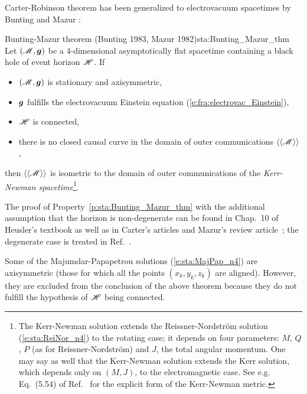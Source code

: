 Carter-Robinson theorem has been generalized to electrovacuum spacetimes
by Bunting \cite{Bunti83} and Mazur \cite{Mazur82}:

\begin{tprop}{Bunting-Mazur theorem
\textnormal{(Bunting 1983, Mazur 1982)}}{sta:Bunting_Mazur_thm}
Let $(\mathscr{M},\bm{g})$ be a 4-dimensional asymptotically flat spacetime
containing a black hole of event horizon $\mathscr{H}$. If
\begin{itemize}
\item $(\mathscr{M},\bm{g})$ is stationary and axisymmetric,
\item $\bm{g}$ fulfills the electrovacuum Einstein equation (\ref{e:fra:electrovac_Einstein}),
\item $\mathscr{H}$ is connected,
\item there is no closed causal curve in the domain of outer communications $\langle\langle \mathscr{M}\rangle\rangle$,
\end{itemize}
then $\langle\langle \mathscr{M}\rangle\rangle$ is isometric
to the domain of outer communications of the
\emph{Kerr-Newman spacetime}\footnote{The Kerr-Newman
solution extends the Reissner-Nordström solution (\ref{e:sta:ReiNor_n4}) to
the rotating case; it depends on four parameters: $M$, $Q$, $P$ (as for Reissner-Nordström)
and $J$, the total angular momentum.
One may say as well that the Kerr-Newman solution extends the Kerr solution,
which depends only on $(M,J)$, to the electromagnetic case.
See e.g. Eq.~(5.54) of Ref.~\cite{Carte73a} for the explicit form of the Kerr-Newman metric.}.
\end{tprop}
The proof of Property~\ref{p:sta:Bunting_Mazur_thm}
with the additional assumption that the horizon is non-degenerate
can be found in Chap.~10 of Heusler's textbook \cite{Heusl96}
as well as in Carter's articles \cite{Carte85,Carte87} and Mazur's review article~\cite{Mazur01}; the degenerate case is treated in
Ref.~\cite{ChrusN10}.

\begin{remark}
Some of the Majumdar-Papapetrou solutions
(\ref{e:sta:MajPap_n4})
are axisymmetric (those for which all the points $(x_k,y_k,z_k)$ are aligned).
However, they are excluded from the conclusion of the above theorem because they
do not fulfill the hypothesis of $\mathscr{H}$ being connected.
\end{remark}

